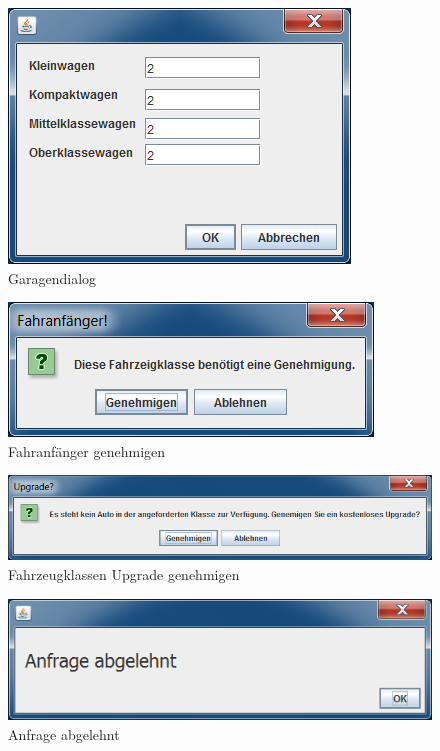 \begin{figure}
	\centering
	\includegraphics[width=0.7\linewidth]{Bilder/Screenshots/Garage}
	\caption{Garagendialog}
	\label{fig:Garage}
\end{figure}

\begin{figure}
	\centering
	\includegraphics[width=0.7\linewidth]{Bilder/Screenshots/Fahranfanger}
	\caption{Fahranfänger genehmigen}
	\label{fig:Fahränfanger}
\end{figure}

\begin{figure}
	\centering
	\includegraphics[width=0.7\linewidth]{Bilder/Screenshots/Upgrade}
	\caption{Fahrzeugklassen Upgrade genehmigen}
	\label{fig:Upgrade}
\end{figure}

\begin{figure}
	\centering
	\includegraphics[width=0.7\linewidth]{Bilder/Screenshots/ergebnis-abgelehnt}
	\caption{Anfrage abgelehnt}
	\label{fig:ergebnisabgelehnt}
\end{figure}

